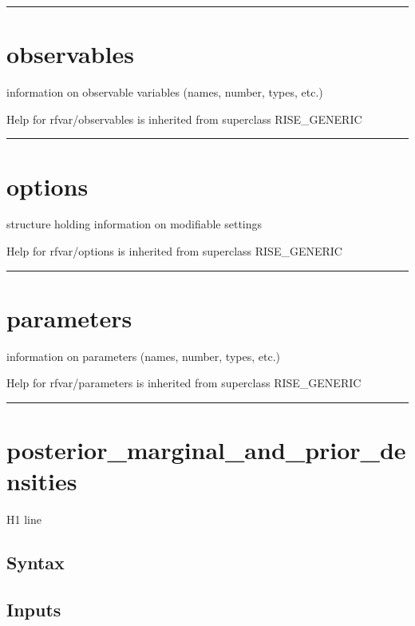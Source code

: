 \documentclass[letterpaper,10pt,english]{sphinxmanual}
\begin{document}
\bigskip\hrule{}\bigskip



\section{observables}
\label{classes/models/@rfvar/rfvar:observables}\label{classes/models/@rfvar/rfvar:id89}
information on observable variables (names, number, types, etc.)

Help for rfvar/observables is inherited from superclass RISE\_GENERIC


\bigskip\hrule{}\bigskip



\section{options}
\label{classes/models/@rfvar/rfvar:id90}\label{classes/models/@rfvar/rfvar:options}
structure holding information on modifiable settings

Help for rfvar/options is inherited from superclass RISE\_GENERIC


\bigskip\hrule{}\bigskip



\section{parameters}
\label{classes/models/@rfvar/rfvar:id91}\label{classes/models/@rfvar/rfvar:parameters}
information on parameters (names, number, types, etc.)

Help for rfvar/parameters is inherited from superclass RISE\_GENERIC


\bigskip\hrule{}\bigskip



\section{posterior\_marginal\_and\_prior\_densities}
\label{classes/models/@rfvar/rfvar:id92}\label{classes/models/@rfvar/rfvar:posterior-marginal-and-prior-densities}
H1 line


\subsection{Syntax}
\label{classes/models/@rfvar/rfvar:id93}

\subsection{Inputs}
\label{classes/models/@rfvar/rfvar:id94}
\end{document}
